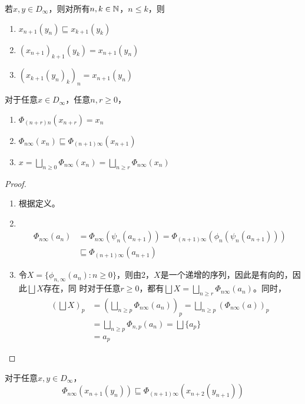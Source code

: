 \documentclass[11pt]{article}
\begin{document}
\begin{lemma}[]
若\(x,y\in D_\infty\)，则对所有\(n,k\in\mathbb{N}\)，\(n\le k\)，则
\begin{enumerate}
\item \(x_{n+1}(y_n)\sqsubseteq x_{k+1}(y_k)\)
\item \((x_{n+1})_{k+1}(y_k)=x_{n+1}(y_n)\)
\item \((x_{k+1}(y_n)_k)_n=x_{n+1}(y_n)\)
\end{enumerate}
\end{lemma}

\begin{lemma}[]
对于任意\(x\in D_\infty\)，任意\(n,r\ge 0\)，
\begin{enumerate}
\item \(\Phi_{(n+r)n}(x_{n+r})=x_n\)
\item \(\Phi_{n\infty}(x_n)\sqsubseteq\Phi_{(n+1)\infty}(x_{n+1})\)
\item \(x=\bigsqcup_{n\ge 0}\Phi_{n\infty}(x_n)=\bigsqcup_{n\ge r}\Phi_{n\infty}(x_n)\)
\end{enumerate}
\end{lemma}

\begin{proof}
\begin{enumerate}
\item 根据定义。
\item ​
\begin{align*}
\Phi_{n\infty}(a_n)&=\Phi_{n\infty}(\psi_n(a_{n+1}))=\Phi_{(n+1)\infty}(\phi_n(\psi_n(a_{n+1})))\\
&\sqsubseteq\Phi_{(n+1)\infty}(a_{n+1})
\end{align*}
\item 令\(X=\{\phi_{n,\infty}(a_n):n\ge 0\}\)，则由2，\(X\)是一个递增的序列，因此是有向的，因此\(\bigsqcup X\)存在，同
时对于任意\(r\ge 0\)，都有\(\bigsqcup X=\bigsqcup_{n\ge r}\Phi_{n\infty}(a_n)\)。同时，
\begin{align*}
(\bigsqcup X)_p&=(\bigsqcup_{n\ge p}\Phi_{n\infty}(a_n))_p=\bigsqcup_{n\ge p}(\Phi_{n\infty}(a))_p\\
&=\bigsqcup_{n\ge p}\Phi_{n,p}(a_n)=\bigsqcup\{a_p\}\\
&=a_p
\end{align*}
\end{enumerate}
\end{proof}

\begin{lemma}[]
\label{16.42}
对于任意\(x,y\in D_\infty\)，
\begin{equation*}
\Phi_{n\infty}(x_{n+1}(y_n))\sqsubseteq\Phi_{(n+1)\infty}(x_{n+2}(y_{n+1}))
\end{equation*}
\end{lemma}
\end{document}
